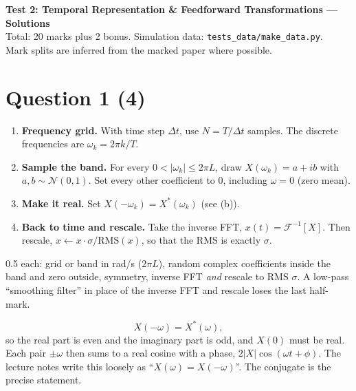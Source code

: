 \documentclass[11pt,letterpaper]{article}
\newcommand{\ans}[1]{\par\vspace{4pt}{\bfseries #1}\quad}
\begin{document}
\begin{center}
{\Large\bfseries Test 2: Temporal Representation \& Feedforward Transformations --- Solutions}\\[2pt]
Total: 20 marks plus 2 bonus. Simulation data: \texttt{tests\_data/make\_data.py}.\\
Mark splits are inferred from the marked paper where possible.
\end{center}

\section*{Question 1 \hfill (4)}

\ans{(a) [2]}
\begin{enumerate}[leftmargin=1.6em, label=\arabic*.]
\item \textbf{Frequency grid.} With time step $\Delta t$, use $N = T/\Delta t$ samples. The discrete frequencies are $\omega_k = 2\pi k/T$.
\item \textbf{Sample the band.} For every $0 < |\omega_k| \le 2\pi L$, draw $X(\omega_k) = a + ib$ with $a, b \sim \mathcal N(0, 1)$. Set every other coefficient to $0$, including $\omega = 0$ (zero mean).
\item \textbf{Make it real.} Set $X(-\omega_k) = X^*(\omega_k)$ (see (b)).
\item \textbf{Back to time and rescale.} Take the inverse FFT, $x(t) = \mathcal F^{-1}[X]$. Then rescale, $x \leftarrow x \cdot \sigma/\mathrm{RMS}(x)$, so that the RMS is exactly $\sigma$.
\end{enumerate}
\begin{marking}
0.5 each: grid or band in rad/s ($2\pi L$), random complex coefficients inside the band and zero outside, symmetry, inverse FFT \emph{and} rescale to RMS $\sigma$. A low-pass ``smoothing filter'' in place of the inverse FFT and rescale loses the last half-mark.
\end{marking}

\ans{(b) [1]}
\[
X(-\omega) = X^*(\omega),
\]
so the real part is even and the imaginary part is odd, and $X(0)$ must be real. Each pair $\pm\omega$ then sums to a real cosine with a phase, $2|X|\cos(\omega t + \phi)$. The lecture notes write this loosely as ``$X(\omega) = X(-\omega)$''. The conjugate is the precise statement.
\end{document}
